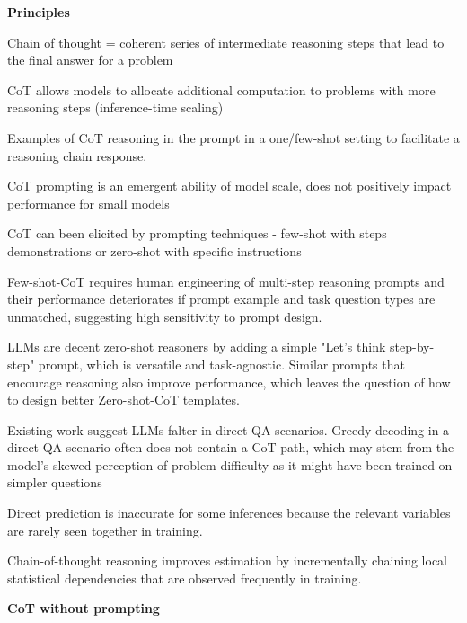 \textbf{Principles}

Chain of thought = coherent series of intermediate reasoning steps that lead to the final answer for a problem \cite{wei2023chainofthoughtpromptingelicitsreasoning}

CoT allows models to allocate additional computation to problems with more reasoning steps (inference-time scaling) \cite{wei2023chainofthoughtpromptingelicitsreasoning}


Examples of CoT reasoning in the prompt in a one/few-shot setting to facilitate a reasoning chain response. \cite{wei2023chainofthoughtpromptingelicitsreasoning}

CoT prompting is an emergent ability of model scale, does not positively impact performance for small models \cite{wei2023chainofthoughtpromptingelicitsreasoning}

CoT can been elicited by prompting techniques - few-shot with steps demonstrations or zero-shot with specific instructions \cite{wang2024chainofthoughtreasoningprompting}

Few-shot-CoT requires human engineering of multi-step reasoning prompts and their performance deteriorates if prompt example and task question types are unmatched, suggesting high sensitivity to prompt design. \cite{NEURIPS2022_8bb0d291}

LLMs are decent zero-shot reasoners by adding a simple "Let's think step-by-step" prompt, which is versatile and task-agnostic. Similar prompts that encourage reasoning also improve performance, which leaves the question of how to design better Zero-shot-CoT templates. \cite{NEURIPS2022_8bb0d291}

Existing work suggest LLMs falter in direct-QA scenarios.  \cite{wang2024chainofthoughtreasoningprompting}
Greedy decoding in a direct-QA scenario often does not contain a CoT path, which may stem from the model's skewed perception of problem difficulty as it might have been trained on simpler questions \cite{wang2024chainofthoughtreasoningprompting}

Direct prediction is inaccurate for some inferences because the relevant variables are rarely seen together in training. \cite{prystawski2023thinkstepstepreasoning}

Chain-of-thought reasoning improves estimation by incrementally chaining local statistical dependencies that are observed frequently in training. \cite{prystawski2023thinkstepstepreasoning}

\textbf{CoT without prompting}

